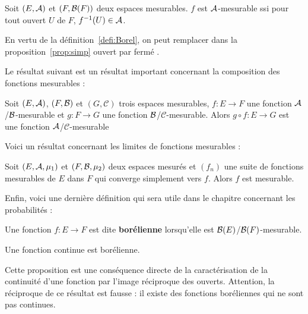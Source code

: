 \documentclass[../integ-proba.tex]{subfiles}
\begin{document}
  \begin{prop}
    \label{prop:simp}
    Soit $\left(E, \mathcal{A}\right)$ et $\left(F, \mathcal{B}(F)\right)$ deux espaces mesurables.
    $f$ est $\mathcal{A}$-mesurable ssi pour tout ouvert $U$ de $F$, $f^{-1}(U) \in \mathcal{A}$.
  \end{prop}

  \begin{rem}
    En vertu de la définition~\ref{defi:Borel}, on peut remplacer dans la proposition~\ref{prop:simp} \og ouvert \fg par \og fermé \fg.
  \end{rem}

  Le résultat suivant est un résultat important concernant la composition des fonctions mesurables :

  \begin{prop}
    \label{prop:compmes}
    Soit $\left(E,\mathcal{A}\right)$, $\left(F,\mathcal{B}\right)$ et $\left(G,\mathcal{C}\right)$ trois espaces mesurables,
    $f : E \longrightarrow F$ une fonction $\mathcal{A}$/$\mathcal{B}$-mesurable et $g : F \longrightarrow G$ une fonction $\mathcal{B}$/$\mathcal{C}$-mesurable.
    Alors $g \circ f : E \longrightarrow G$ est une fonction $\mathcal{A}$/$\mathcal{C}$-mesurable
  \end{prop}

  Voici un résultat concernant les limites de fonctions mesurables :

  \begin{prop}
    \label{prop:limite_simple_mesurables}
    Soit $\left( E, \mathcal{A}, \mu_1 \right)$ et $\left( F, \mathcal{B}, \mu_2 \right)$ deux espaces mesurés et $\left( f_n \right)$ une suite de fonctions mesurables de $E$ dans $F$ qui converge simplement vers $f$.
    Alors $f$ est mesurable.
  \end{prop}

  Enfin, voici une dernière définition qui sera utile dans le chapitre concernant les probabilités :

  \begin{defi}
    Une fonction $f:E\longrightarrow F$ est dite \textbf{borélienne} lorsqu'elle est $\mathcal{B}(E)$/$\mathcal{B}(F)$-mesurable.
  \end{defi}

  \begin{prop}
    \label{prop:continue_implique_borelienne}
    Une fonction continue est borélienne.
  \end{prop}

  \begin{rem}
    Cette proposition est une conséquence directe de la caractérisation de la continuité d'une fonction par l'image réciproque des ouverts.
    Attention, la réciproque de ce résultat est fausse : il existe des fonctions boréliennes qui ne sont pas continues.
  \end{rem}
\end{document}
